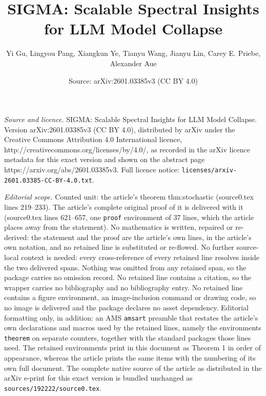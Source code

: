 \documentclass[10pt,a4paper]{amsart}
\title{SIGMA: Scalable Spectral Insights for LLM Model Collapse}
\author{Yi Gu, Lingyou Pang, Xiangkun Ye, Tianyu Wang, Jianyu Lin, Carey E. Priebe, Alexander Aue}
\date{Source: arXiv:2601.03385v3 (CC BY 4.0)}
\begin{document}
\maketitle

\noindent\emph{Source and licence.} SIGMA: Scalable Spectral Insights for LLM Model Collapse. Version arXiv:2601.03385v3 (CC BY 4.0), distributed by arXiv under the Creative Commons Attribution 4.0 International licence, http://creativecommons.org/licenses/by/4.0/, as recorded in the arXiv licence metadata for this exact version and shown on the abstract page https://arxiv.org/abs/2601.03385v3. Full licence notice: \texttt{licenses/arxiv-2601.03385-CC-BY-4.0.txt}.\par\smallskip

\noindent\textit{Editorial scope.} Counted unit: the article's theorem thm:stochastic (source0.tex lines 219--233). The article's complete original proof of it is delivered with it (source0.tex lines 621--657, one \texttt{proof} environment of 37 lines, which the article places away from the statement). No mathematics is written, repaired or re-derived: the statement and the proof are the article's own lines, in the article's own notation, and no retained line is substituted or re-flowed.  No further source-local context is needed: every cross-reference of every retained line resolves inside the two delivered spans.  Nothing was omitted from any retained span, so the package carries no omission record.  No retained line contains a citation, so the wrapper carries no bibliography and no bibliography entry.  No retained line contains a figure environment, an image-inclusion command or drawing code, so no image is delivered and the package declares no asset dependency.  Editorial formatting only, in addition: an AMS \texttt{amsart} preamble that restates the article's own declarations and macros used by the retained lines, namely the environments \texttt{theorem} on separate counters, together with the standard packages those lines need.  The retained environments print in this document as Theorem 1 in order of appearance, whereas the article prints the same items with the numbering of its own full document.  The complete native source of the article as distributed in the arXiv e-print for this exact version is bundled unchanged as \texttt{sources/192222/source0.tex}.
\end{document}
